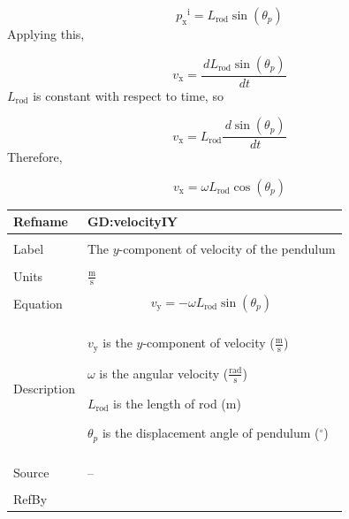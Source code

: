 \documentclass[12pt]{article}
\begin{document}
\begin{displaymath}
{{p_{\text{x}}}^{\text{i}}}={L_{\text{rod}}} \sin\left({θ_{p}}\right)
\end{displaymath}
Applying this,

\begin{displaymath}
{v_{\text{x}}}=\frac{\,d{L_{\text{rod}}} \sin\left({θ_{p}}\right)}{\,dt}
\end{displaymath}
${L_{\text{rod}}}$ is constant with respect to time, so

\begin{displaymath}
{v_{\text{x}}}={L_{\text{rod}}} \frac{\,d\sin\left({θ_{p}}\right)}{\,dt}
\end{displaymath}
Therefore,

\begin{displaymath}
{v_{\text{x}}}=ω {L_{\text{rod}}} \cos\left({θ_{p}}\right)
\end{displaymath}
\vspace{\baselineskip}
\noindent
\begin{minipage}{\textwidth}
\begin{tabular}{>{\raggedright}p{}>{\raggedright\arraybackslash}p{}}
\toprule \textbf{Refname} & \textbf{GD:velocityIY}
\label{GD:velocityIY}
\\ \midrule \\
Label & The $y$-component of velocity of the pendulum
        
\\ \midrule \\
Units & $\frac{\text{m}}{\text{s}}$
        
\\ \midrule \\
Equation & \begin{displaymath}
           {v_{\text{y}}}=-ω {L_{\text{rod}}} \sin\left({θ_{p}}\right)
           \end{displaymath}
\\ \midrule \\
Description & \begin{symbDescription}
              \item{${v_{\text{y}}}$ is the $y$-component of velocity ($\frac{\text{m}}{\text{s}}$)}
              \item{$ω$ is the angular velocity ($\frac{\text{rad}}{\text{s}}$)}
              \item{${L_{\text{rod}}}$ is the length of rod (${\text{m}}$)}
              \item{${θ_{p}}$ is the displacement angle of pendulum (${{}^{\circ}}$)}
              \end{symbDescription}
\\ \midrule \\
Source & --
         
\\ \midrule \\
RefBy & 
\\ \bottomrule
\end{tabular}
\end{minipage}
\end{document}
